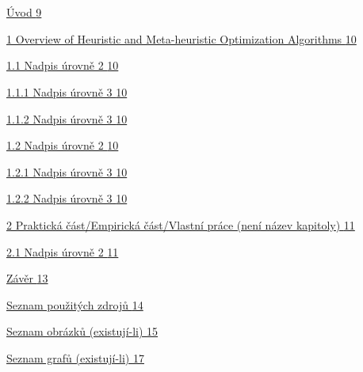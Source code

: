 \documentclass[
]{article}
\begin{document}
\hypertarget{section}{%
  \section{}\label{section}}

\protect\hyperlink{uxfavod}{Úvod \protect\hyperlink{uxfavod}{9}}

\protect\hyperlink{teoretickuxe1-ux10duxe1st-nenuxed-nuxe1zev-kapitoly}{1
  Overview of Heuristic and Meta-heuristic Optimization Algorithms
  \protect\hyperlink{teoretickuxe1-ux10duxe1st-nenuxed-nuxe1zev-kapitoly}{10}}

\protect\hyperlink{nadpis-uxfarovnux11b-2}{1.1 Nadpis úrovně 2
  \protect\hyperlink{nadpis-uxfarovnux11b-2}{10}}

\protect\hyperlink{nadpis-uxfarovnux11b-3}{1.1.1 Nadpis úrovně 3
  \protect\hyperlink{nadpis-uxfarovnux11b-3}{10}}

\protect\hyperlink{nadpis-uxfarovnux11b-3-1}{1.1.2 Nadpis úrovně 3
  \protect\hyperlink{nadpis-uxfarovnux11b-3-1}{10}}

\protect\hyperlink{nadpis-uxfarovnux11b-2-1}{1.2 Nadpis úrovně 2
  \protect\hyperlink{nadpis-uxfarovnux11b-2-1}{10}}

\protect\hyperlink{nadpis-uxfarovnux11b-3-2}{1.2.1 Nadpis úrovně 3
  \protect\hyperlink{nadpis-uxfarovnux11b-3-2}{10}}

\protect\hyperlink{nadpis-uxfarovnux11b-3-3}{1.2.2 Nadpis úrovně 3
  \protect\hyperlink{nadpis-uxfarovnux11b-3-3}{10}}

\protect\hyperlink{praktickuxe1-ux10duxe1stempirickuxe1-ux10duxe1stvlastnuxed-pruxe1ce-nenuxed-nuxe1zev-kapitoly}{2
  Praktická část/Empirická část/Vlastní práce (není název kapitoly)
  \protect\hyperlink{praktickuxe1-ux10duxe1stempirickuxe1-ux10duxe1stvlastnuxed-pruxe1ce-nenuxed-nuxe1zev-kapitoly}{11}}

\protect\hyperlink{nadpis-uxfarovnux11b-2-2}{2.1 Nadpis úrovně 2
  \protect\hyperlink{nadpis-uxfarovnux11b-2-2}{11}}

\protect\hyperlink{zuxe1vux11br}{Závěr
  \protect\hyperlink{zuxe1vux11br}{13}}

\protect\hyperlink{seznam-pouux17eituxfdch-zdrojux16f}{Seznam použitých
  zdrojů \protect\hyperlink{seznam-pouux17eituxfdch-zdrojux16f}{14}}

\protect\hyperlink{seznam-obruxe1zkux16f-existujuxed-li}{Seznam obrázků
  (existují-li)
  \protect\hyperlink{seznam-obruxe1zkux16f-existujuxed-li}{15}}

\protect\hyperlink{seznam-grafux16f-existujuxed-li}{Seznam grafů
  (existují-li) \protect\hyperlink{seznam-grafux16f-existujuxed-li}{17}}
\end{document}
